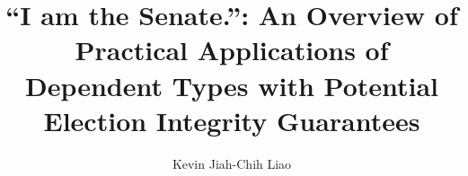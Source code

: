 \documentclass[a4paper,12pt,twoside]{report}
\begin{document}
\title{\LARGE {\bf ``I am the Senate.'': An Overview of Practical Applications of Dependent Types with Potential Election Integrity Guarantees}\\
 \vspace*{6mm}
}

\author{Kevin Jiah-Chih Liao}

\normallinespacing
\maketitle

\preface
% 
% 
% 
% 
\body

% 


% 

\appendix




\end{document}
